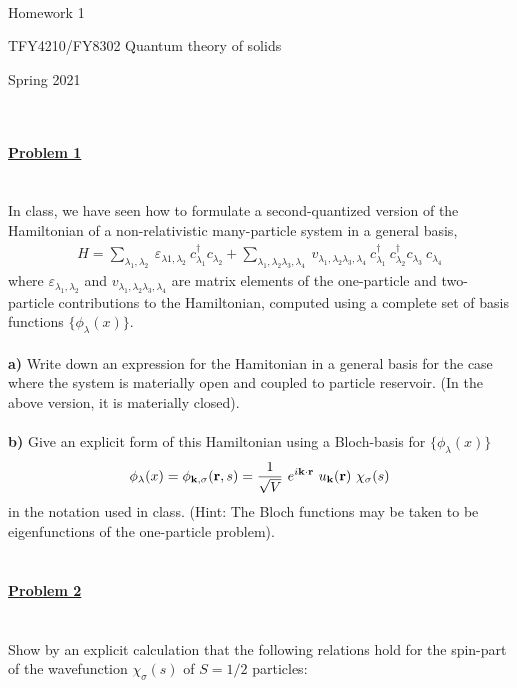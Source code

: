 \documentclass{article}
\begin{document}
\\

\centerline{\Large Homework 1}
\centerline{\Large  TFY4210/FY8302 Quantum theory of solids}
\centerline{\Large Spring 2021}
\normalsize
\ \\
\ \\
\underline{\large\bf Problem 1 }\\
\ \\
\ \\
In class, we have seen how to formulate a second-quantized version of the Hamiltonian of a non-relativistic many-particle system in a general basis,
\begin{eqnarray}
H = \sum_{\lambda_1,\lambda_2} ~ \varepsilon_{\lambda1,\lambda_2}~ c^{\dagger}_{\lambda_1}  c_{\lambda_2} 
+ \sum_{\lambda_1,\lambda_2\lambda_3,\lambda_4}
~v_{\lambda_1,\lambda_2\lambda_3,\lambda_4}~
 c^{\dagger}_{\lambda_1} ~ c^{\dagger}_{\lambda_2}  c_{\lambda_3} ~ c_{\lambda_4}  \nonumber
\end{eqnarray}
where $\varepsilon_{\lambda_1,\lambda_2}$ and $v_{\lambda_1,\lambda_2\lambda_3,\lambda_4}$ are matrix elements of the one-particle and two-particle contributions to the Hamiltonian, computed using a complete set of basis functions $\{ \phi_{\lambda}(x) \}$.
\ \\
\ \\
{\bf a)} Write down an expression for the Hamitonian in a general basis for the case where the system is materially open and coupled to particle reservoir. (In the above version, it is materially closed).
\ \\
\ \\
{\bf b) } Give an explicit form of this   Hamiltonian using a Bloch-basis for $\{ \phi_{\lambda}(x) \}$
\begin{eqnarray}
\phi_{\lambda}(x) = \phi_{{\bf k},\sigma}({\bf r},s)  = \frac{1}{\sqrt{V}} ~e^{i {\bf k} \cdot {\bf r}} ~ u_{\bf k} ({\bf r}) ~ \chi_{\sigma}(s) \nonumber
\end{eqnarray}
in the notation used in class. (Hint: The Bloch functions may be taken to be eigenfunctions of the one-particle problem). 
\ \\
\ \\
\ \\
\underline{\large\bf Problem 2 }\\
\ \\
\ \\
Show by an explicit calculation that the following relations hold for the spin-part of the wavefunction $\chi_\sigma(s)$ of $S=1/2$ particles:
\end{document}

